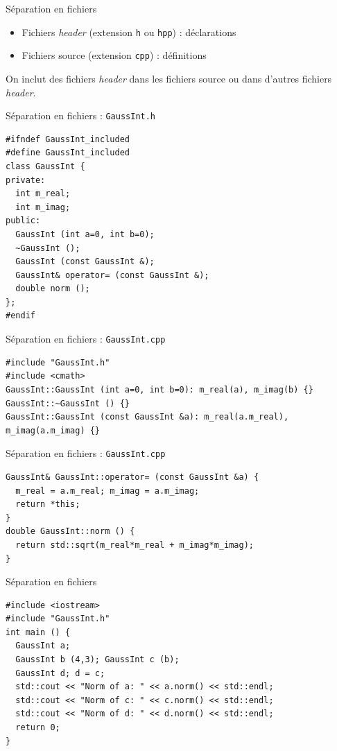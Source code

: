 \begin{frame}{Séparation en fichiers}
  \begin{itemize}
  \item Fichiers \textit{header} (extension \texttt{h} ou \texttt{hpp}) : déclarations
  \item Fichiers source (extension \texttt{cpp}) : définitions
  \end{itemize}

  On inclut des fichiers \textit{header} dans les fichiers source ou dans d'autres fichiers \textit{header}.
\end{frame}

\begin{frame}[fragile]{Séparation en fichiers : \texttt{GaussInt.h}}
  \begin{lstlisting}
#ifndef GaussInt_included
#define GaussInt_included
class GaussInt {
private:
  int m_real;
  int m_imag;
public:
  GaussInt (int a=0, int b=0);
  ~GaussInt ();
  GaussInt (const GaussInt &);
  GaussInt& operator= (const GaussInt &);
  double norm ();
};
#endif
  \end{lstlisting}
\end{frame}

\begin{frame}[fragile]{Séparation en fichiers : \texttt{GaussInt.cpp}}
  \begin{lstlisting}
#include "GaussInt.h"
#include <cmath>
GaussInt::GaussInt (int a=0, int b=0): m_real(a), m_imag(b) {}
GaussInt::~GaussInt () {}
GaussInt::GaussInt (const GaussInt &a): m_real(a.m_real), m_imag(a.m_imag) {}
  \end{lstlisting}
\end{frame}

\begin{frame}[fragile]{Séparation en fichiers : \texttt{GaussInt.cpp}}
  \begin{lstlisting}
GaussInt& GaussInt::operator= (const GaussInt &a) {
  m_real = a.m_real; m_imag = a.m_imag;
  return *this;
}
double GaussInt::norm () {
  return std::sqrt(m_real*m_real + m_imag*m_imag);
}
  \end{lstlisting}
\end{frame}

\begin{frame}[fragile]{Séparation en fichiers}
  \begin{lstlisting}
#include <iostream>
#include "GaussInt.h"
int main () {
  GaussInt a;
  GaussInt b (4,3); GaussInt c (b);
  GaussInt d; d = c;
  std::cout << "Norm of a: " << a.norm() << std::endl;
  std::cout << "Norm of c: " << c.norm() << std::endl;
  std::cout << "Norm of d: " << d.norm() << std::endl;
  return 0;
}
  \end{lstlisting}
\end{frame}

